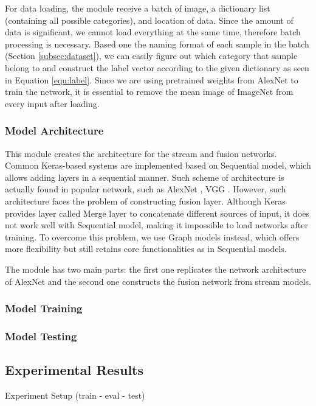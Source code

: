 For data loading, the module receive a batch of image, a dictionary list (containing all possible categories), and location of data. Since the amount of data is significant, we cannot load everything at the same time, therefore batch processing is necessary. Based one the naming format of each sample in the batch (Section \ref{subsec:dataset}), we can easily figure out which category that sample belong to and construct the label vector according to the given dictionary
as seen in Equation \ref{equ:label}. Since we are using pretrained weights from AlexNet to train the network, it is essential to remove the mean image of ImageNet from every input after loading.

\subsubsection{Model Architecture}
This module creates the architecture for the stream and fusion networks. Common Keras-based systems are implemented based on Sequential model, which allows adding layers in a sequential manner. Such scheme of architecture is actually found in popular network, such as AlexNet \cite{Krizhevsky2012_alexnet}, VGG \cite{Simonyan2014_vgg}. However, such architecture faces the problem of constructing fusion layer. Although Keras provides layer called Merge layer to concatenate different sources of input, it does not work well with Sequential model, making it impossible to load networks after training. To overcome this problem, we use Graph models instead, which offers more flexibility but still retains core functionalities as in Sequential models.

The module has two main parts: the first one replicates the network architecture of AlexNet and the second one constructs the fusion network from stream models. 

\subsubsection{Model Training}

\subsubsection{Model Testing}

\subsection{Experimental Results}

Experiment Setup (train - eval - test)

